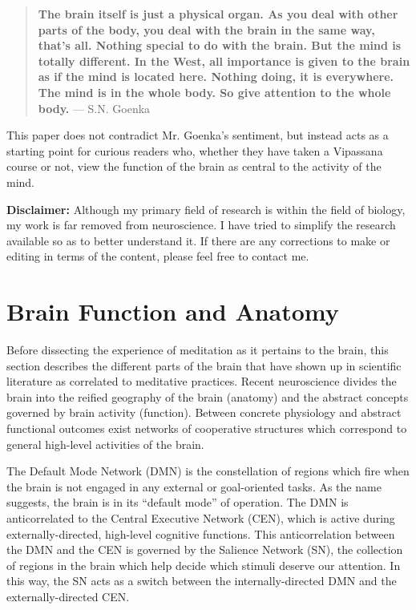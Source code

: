 \documentclass[a4paper, amsfonts, amssymb, amsmath, reprint, showkeys, nofootinbib, twoside]{revtex4-1}
\begin{document}
\begin{quote}
  \textbf{The brain itself is just a physical organ. As you deal with other parts of
    the body, you deal with the brain in the same way, that's all. Nothing special to
    do with the brain. But the mind is totally different. In the West, all importance
    is given to the brain as if the mind is located here. Nothing doing, it is
    everywhere. The mind is in the whole body. So give attention to the whole
    body.} --- S.N. Goenka \cite{goenkabrain}
\end{quote}

This paper does not contradict Mr. Goenka's sentiment, but instead acts as a starting
point for curious readers who, whether they have taken a Vipassana course or not,
view the function of the brain as central to the activity of the mind.

\textbf{Disclaimer:} Although my primary field of research is within the field of
biology, my work is far removed from neuroscience. I have tried to simplify the research available so as to better
understand it. If there are any corrections to make or editing in terms of the
content, please feel free to contact me.


\section{Brain Function and Anatomy}

Before dissecting the experience of meditation as it pertains to the brain, this
section describes the different parts of the brain that have shown up in
scientific literature as correlated to meditative practices. Recent neuroscience divides the
brain into the reified geography of the brain (anatomy) and the abstract concepts
governed by brain activity (function). Between concrete physiology and abstract
functional outcomes exist networks of cooperative structures which correspond to general
high-level activities of the brain.

The Default Mode Network (DMN) is the constellation of regions which fire when
the brain is not engaged in any external or goal-oriented
tasks. As the name suggests, the brain is in its ``default
mode'' of operation. \cite{defaultnetworkadaptive} The DMN is anticorrelated to the Central Executive
Network (CEN), which is active during externally-directed, high-level cognitive
functions. \cite{saliencenetwork} This anticorrelation between the DMN and the CEN is
governed by the Salience Network (SN), the collection of regions in the brain which
help decide which stimuli deserve our attention. In this way, the SN acts as a switch between the
internally-directed DMN and the externally-directed CEN. \cite{saliencenetwork}
\end{document}
